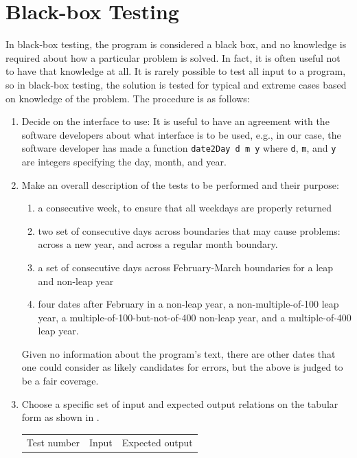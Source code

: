 \documentclass[fsharpNotes.tex]{subfiles}
\begin{document}
\section{Black-box Testing}
In black-box testing, the program is considered a black box, and no knowledge is required about how a particular problem is solved. In fact, it is often useful not to have that knowledge at all. It is rarely possible to test all input to a program, so in black-box testing, the solution is tested for typical and extreme cases based on knowledge of the problem. The procedure is as follows:
\begin{enumerate}
\item Decide on the interface to use: It is useful to have an agreement with the software developers about what interface is to be used, e.g., in our case, the software developer has made a function \lstinline!date2Day d m y! where \lstinline!d!, \lstinline!m!, and \lstinline!y! are integers specifying the day, month, and year.
\item Make an overall description of the tests to be performed and their purpose:
  \begin{enumerate}[label=\arabic*]
  \item\label{allWeekDays} a consecutive week, to ensure that all weekdays are properly returned
  \item\label{crossBondaries} two set of consecutive days across boundaries that may cause problems: across a new year, and across a regular month boundary.
  \item\label{februaryBoundaries} a set of consecutive days across February-March boundaries for a leap and non-leap year
  \item\label{leapYears} four dates after February in a non-leap year, a non-multiple-of-100 leap year, a multiple-of-100-but-not-of-400 non-leap year, and a multiple-of-400 leap year.
  \end{enumerate}
  Given no information about the program's text, there are other dates that one could consider as likely candidates for errors, but the above is judged to be a fair coverage.
\item Choose a specific set of input and expected output relations on the tabular form as shown in .
  \begin{table}
\begin{center}
  \begin{tabular}{|l|r|l|}
    \hline
    \rowcolor{headerRowColor} Test number&Input& Expected output\\

\end{tabular}
\end{center}
\end{table}
\end{enumerate}
\end{document}
